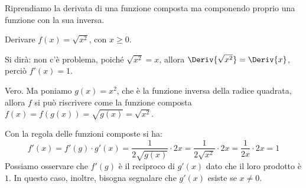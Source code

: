% 
% 

\vspace{1em}
Riprendiamo la derivata di una funzione composta ma componendo proprio una 
funzione con la sua inversa.

\begin{esempio}
Derivare \(f(x)=\sqrt{x^2}\), con \(x \ge 0\).

Si dirà: non c'è problema, poiché \(\sqrt{x^2}=x\), allora 
\(\Deriv{\sqrt{x^2}}=\Deriv{x}\), perciò  \(f'(x)=1\).

Vero. Ma poniamo \(g(x)=x^2\), che è la funzione inversa della radice quadrata, 
allora \(f\) si può riscrivere come la funzione 
composta \(f(x)=f(g(x))=\sqrt{g(x)}=\sqrt{x^2}\).

Con la regola delle funzioni composte si ha: 
\[f'(x)=f'(g)\cdot g'(x)= \dfrac{1}{2\sqrt{g(x)}}\cdot 2x =
\dfrac{1}{2\sqrt{x^2}}\cdot 2x=\dfrac{1}{2x}\cdot 2x = 1\]
Possiamo osservare che \(f'(g)\) è il reciproco di \(g'(x)\) dato che 
il loro prodotto è \(1\). 
In questo caso, inoltre, bisogna segnalare che \(g'(x)\) esiste se 
\(x \ne 0\).
\end{esempio}

